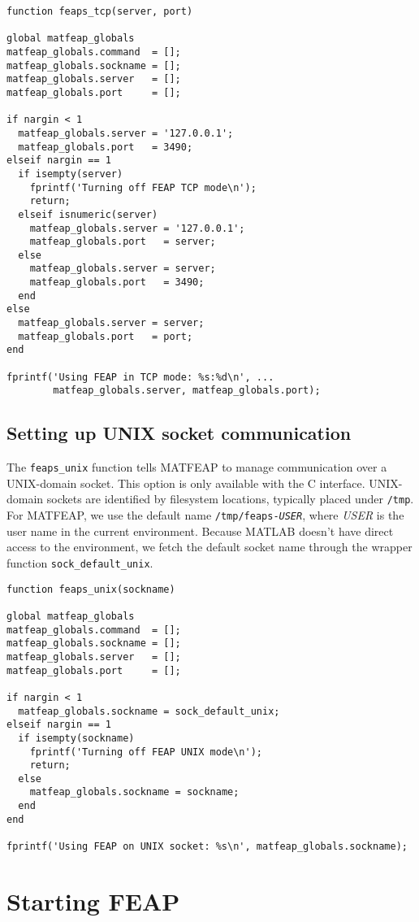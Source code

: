\begin{verbatim}
function feaps_tcp(server, port)

global matfeap_globals
matfeap_globals.command  = [];
matfeap_globals.sockname = [];
matfeap_globals.server   = [];
matfeap_globals.port     = [];

if nargin < 1
  matfeap_globals.server = '127.0.0.1';
  matfeap_globals.port   = 3490;
elseif nargin == 1
  if isempty(server)
    fprintf('Turning off FEAP TCP mode\n');
    return;
  elseif isnumeric(server)
    matfeap_globals.server = '127.0.0.1';
    matfeap_globals.port   = server;
  else
    matfeap_globals.server = server;
    matfeap_globals.port   = 3490;
  end
else
  matfeap_globals.server = server;
  matfeap_globals.port   = port;
end

fprintf('Using FEAP in TCP mode: %s:%d\n', ...
        matfeap_globals.server, matfeap_globals.port);

\end{verbatim}
\subsection{Setting up UNIX socket communication}

The {\tt feaps\_unix} function tells MATFEAP to manage communication
over a UNIX-domain socket.  This option is only available with the C
interface.  UNIX-domain sockets are identified by filesystem locations,
typically placed under {\tt /tmp}.  For MATFEAP, we use the default
name {\tt /tmp/feaps-{\it USER}}, where {\it USER} is the user name in
the current environment.  Because MATLAB doesn't have direct access to
the environment, we fetch the default socket name through the wrapper
function {\tt sock\_default\_unix}.

\begin{verbatim}
function feaps_unix(sockname)

global matfeap_globals
matfeap_globals.command  = [];
matfeap_globals.sockname = [];
matfeap_globals.server   = [];
matfeap_globals.port     = [];

if nargin < 1
  matfeap_globals.sockname = sock_default_unix;
elseif nargin == 1
  if isempty(sockname)
    fprintf('Turning off FEAP UNIX mode\n');
    return;
  else
    matfeap_globals.sockname = sockname;
  end
end

fprintf('Using FEAP on UNIX socket: %s\n', matfeap_globals.sockname);

\end{verbatim}
\section{Starting FEAP}

